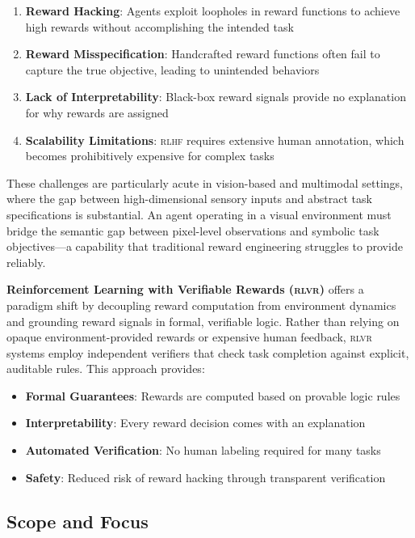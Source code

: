 \documentclass[11pt,a4paper]{article}
\newcommand{\rlvr}{\textsc{rlvr}}
\newcommand{\rlhf}{\textsc{rlhf}}
\begin{document}
\begin{enumerate}[leftmargin=*]
    \item \textbf{Reward Hacking}: Agents exploit loopholes in reward functions to achieve high rewards without accomplishing the intended task
    \item \textbf{Reward Misspecification}: Handcrafted reward functions often fail to capture the true objective, leading to unintended behaviors
    \item \textbf{Lack of Interpretability}: Black-box reward signals provide no explanation for why rewards are assigned
    \item \textbf{Scalability Limitations}: \rlhf{} requires extensive human annotation, which becomes prohibitively expensive for complex tasks
\end{enumerate}

These challenges are particularly acute in vision-based and multimodal settings, where the gap between high-dimensional sensory inputs and abstract task specifications is substantial. An agent operating in a visual environment must bridge the semantic gap between pixel-level observations and symbolic task objectives---a capability that traditional reward engineering struggles to provide reliably.

\textbf{Reinforcement Learning with Verifiable Rewards (\rlvr{})} offers a paradigm shift by decoupling reward computation from environment dynamics and grounding reward signals in formal, verifiable logic. Rather than relying on opaque environment-provided rewards or expensive human feedback, \rlvr{} systems employ independent verifiers that check task completion against explicit, auditable rules. This approach provides:

\begin{itemize}[leftmargin=*]
    \item \textbf{Formal Guarantees}: Rewards are computed based on provable logic rules
    \item \textbf{Interpretability}: Every reward decision comes with an explanation
    \item \textbf{Automated Verification}: No human labeling required for many tasks
    \item \textbf{Safety}: Reduced risk of reward hacking through transparent verification
\end{itemize}

\subsection{Scope and Focus}
\label{sec:scope}
\end{document}
